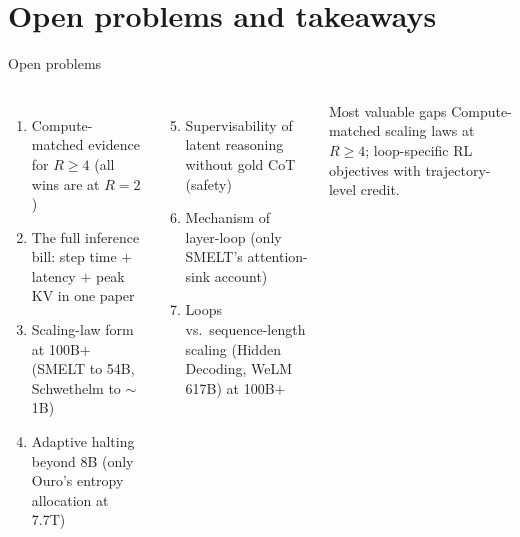 \documentclass[aspectratio=169,10pt]{beamer}
\begin{document}
\section{Open problems and takeaways}

\begin{frame}{Open problems}
  \begin{columns}[T]
      \begin{enumerate}
        \item Compute-matched evidence for $R \ge 4$ (all wins are at $R{=}2$)
        \item The full inference bill: step time $+$ latency $+$ peak KV in one paper
        \item Scaling-law form at 100B$+$ (SMELT to 54B, Schwethelm to $\sim$1B)
        \item Adaptive halting beyond 8B (only Ouro's entropy allocation at 7.7T)
      \end{enumerate}
      \begin{enumerate}\setcounter{enumi}{4}
        \item Supervisability of latent reasoning without gold CoT (safety)
        \item Mechanism of layer-loop (only SMELT's attention-sink account)
        \item Loops vs.\ sequence-length scaling (Hidden Decoding, WeLM 617B) at 100B$+$
      \end{enumerate}
      \begin{exampleblock}{Most valuable gaps}
        Compute-matched scaling laws at $R \ge 4$; loop-specific RL objectives with trajectory-level credit.
      \end{exampleblock}
  \end{columns}
\end{frame}
\end{document}
